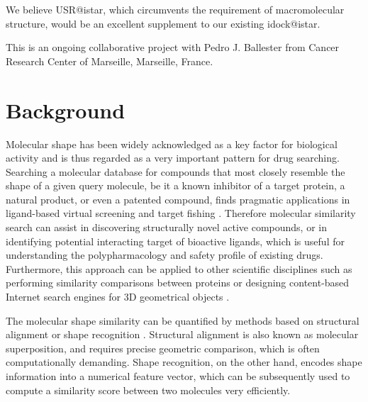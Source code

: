 We believe USR@istar, which circumvents the requirement of macromolecular structure, would be an excellent supplement to our existing idock@istar.

This is an ongoing collaborative project with Pedro J. Ballester from Cancer Research Center of Marseille, Marseille, France.

\section{Background}

Molecular shape has been widely acknowledged as a key factor for biological activity and is thus regarded as a very important pattern for drug searching. Searching a molecular database for compounds that most closely resemble the shape of a given query molecule, be it a known inhibitor of a target protein, a natural product, or even a patented compound, finds pragmatic applications in ligand-based virtual screening \citep{1332,1380,1281,1504,1502,1615} and target fishing \citep{1528,1407,1408,1402}. Therefore molecular similarity search can assist in discovering structurally novel active compounds, or in identifying potential interacting target of bioactive ligands, which is useful for understanding the polypharmacology and safety profile of existing drugs. Furthermore, this approach can be applied to other scientific disciplines such as performing similarity comparisons between proteins or designing content-based Internet search engines for 3D geometrical objects \citep{1280}.

The molecular shape similarity can be quantified by methods based on structural alignment \citep{1440,887,1439,1534} or shape recognition \citep{1379,1338,1331}. Structural alignment is also known as molecular superposition, and requires precise geometric comparison, which is often computationally demanding. Shape recognition, on the other hand, encodes shape information into a numerical feature vector, which can be subsequently used to compute a similarity score between two molecules very efficiently.


